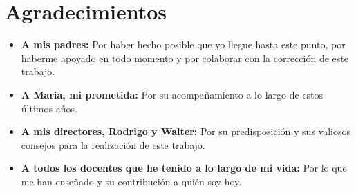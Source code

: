 \chapter*{Agradecimientos}

\begin{itemize}
    \item \textbf{A mis padres:} Por haber hecho posible que yo llegue hasta este punto, por haberme apoyado en todo momento y por colaborar con la corrección de este trabajo.
    \item \textbf{A Maria, mi prometida:} Por su acompañamiento a lo largo de estos últimos años.
    \item \textbf{A mis directores, Rodrigo y Walter:} Por su predisposición y sus valiosos consejos para la realización de este trabajo.
    \item \textbf{A todos los docentes que he tenido a lo largo de mi vida:} Por lo que me han enseñado y su contribución a quién soy hoy.
\end{itemize}

